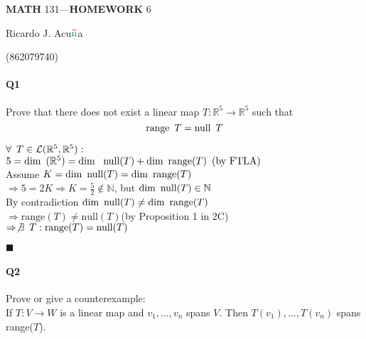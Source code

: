 \documentclass{article}
\begin{document}
\begin{center}
  \textbf{MATH} 131---\textbf{HOMEWORK} 6

  \color{red}R\color{teal}icardo
  \color{red}J\color{cyan}.
  \color{red}A\color{teal}cu$\color{red}{\widetilde{\color{teal}\text{n}}}$\color{teal}a\color{black}

  \color{teal}(\color{red}862079740\color{teal})\color{black}
\end{center}\vspace{1.618em}

\paragraph{Q1} Prove that there does not exist a linear map $T:
\mathbb{R}^5 \rightarrow \mathbb{R}^5$ such that
\begin{equation*}\text{range}\enskip T = \text{null}\enskip
  T \end{equation*}
\vspace{0.618 em}

$\forall\enskip T \in \mathcal{L}(\mathbb{R}^5,\mathbb{R}^5):$\\
$5 = \text{dim\enskip} (\mathbb{R}^5) = \text{dim \enskip null} (T) +
\text{dim\enskip range} (T) \text{\enskip(by FTLA)}$\\
Assume $K = \text{dim\enskip null} (T) = \text{dim\enskip range} (T)$\\
$\Rightarrow 5 = 2K
\Rightarrow K= \frac{5}{2} \notin \mathbb{N}$, but\enskip
$\text{dim\enskip null}
(T) \in \mathbb{N}$\\
By contradiction $\text{dim\enskip null} (T) \neq \text{dim\enskip
  range} (T)$\\
$\Rightarrow \text{range} (T) \neq \text{null} (T)$\quad (by Proposition 1
in 2C)\\
$\Rightarrow \not\exists\enskip T: \text{range} (T) = \text{null}
(T)$\vspace{0.618 em}

$\blacksquare$

\paragraph{Q2} Prove or give a counterexample:\\
If $T: V \rightarrow W$ is a linear map and $v_1, ... , v_n$ spans
$V$. Then $T(v_1), ... , T(v_n)$ spans range($T$).

\vspace{0.618 em}
\end{document}
